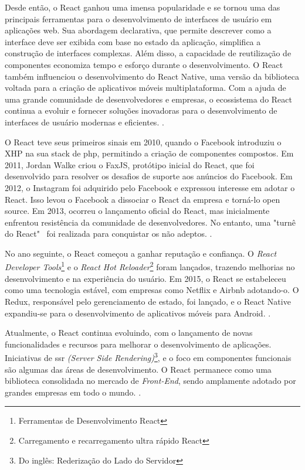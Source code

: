 Desde então, o React ganhou uma imensa popularidade e se tornou uma das
principais ferramentas para o desenvolvimento de interfaces de usuário em aplicações web.
Sua abordagem declarativa, que permite descrever como a interface deve ser exibida com
base no estado da aplicação, simplifica a construção de interfaces complexas. Além disso, a
capacidade de reutilização de componentes economiza tempo e esforço durante o
desenvolvimento. O React também influenciou o desenvolvimento do React Native, uma
versão da biblioteca voltada para a criação de aplicativos móveis multiplataforma. Com a
ajuda de uma grande comunidade de desenvolvedores e empresas, o ecossistema do React
continua a evoluir e fornecer soluções inovadoras para o desenvolvimento de interfaces de
usuário modernas e eficientes.
\cite{morais-react}.

O React teve seus primeiros sinais em 2010, quando o Facebook introduziu o XHP
na sua stack de
\acrshort{php},
permitindo a criação de componentes compostos. Em 2011, Jordan
Walke criou o FaxJS, protótipo inicial do React, que foi desenvolvido para resolver os
desafios de suporte aos anúncios do Facebook. Em 2012, o Instagram foi adquirido pelo
Facebook e expressou interesse em adotar o React. Isso levou o Facebook a dissociar o React
da empresa e torná-lo open source. Em 2013, ocorreu o lançamento oficial do React, mas
inicialmente enfrentou resistência da comunidade de desenvolvedores. No entanto, uma "turnê
do React"~ foi realizada para conquistar os não adeptos.
\cite{morais-react}.

No ano seguinte, o React começou a ganhar reputação e confiança. O
\textit{React Developer Tools}\footnote{Ferramentas de Desenvolvimento React
}
e o
\textit{React Hot Reloader}\footnote{Carregamento e recarregamento ultra rápido React
}
foram lançados, trazendo melhorias no
desenvolvimento e na experiência do usuário. Em 2015, o React se estabeleceu como uma
tecnologia estável, com empresas como Netflix e Airbnb adotando-o. O Redux, responsável
pelo gerenciamento de estado, foi lançado, e o React Native expandiu-se para o
desenvolvimento de aplicativos móveis para Android.
\cite{morais-react}.

Atualmente, o React continua evoluindo, com o lançamento de novas
funcionalidades e recursos para melhorar o desenvolvimento de aplicações. Iniciativas de
\acrshort{ssr}
\textit{(Server Side Rendering)}\footnote{Do inglês: Rederização do Lado do Servidor
}, e o foco em componentes funcionais são algumas das áreas de
desenvolvimento. O React permanece como uma biblioteca consolidada no mercado de
\textit{Front-End}, sendo amplamente adotado por grandes empresas em todo o mundo.
\cite{morais-react}.

